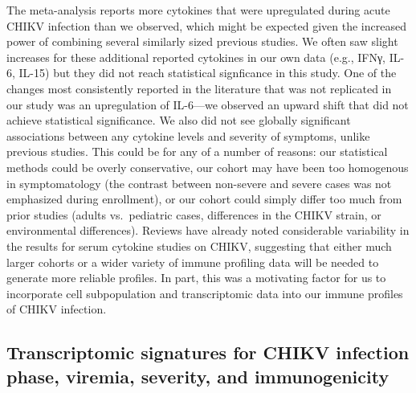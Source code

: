 The meta-analysis reports more cytokines that were upregulated during acute CHIKV infection than we observed, which might be expected given the increased power of combining several similarly sized previous studies. We often saw slight increases for these additional reported cytokines in our own data (e.g., IFNγ, IL-6, IL-15) but they did not reach statistical signficance in this study. One of the changes most consistently reported in the literature that was not replicated in our study was an upregulation of IL-6—we observed an upward shift that did not achieve statistical significance.\autocite{Chow2011,Ng2009} We also did not see globally significant associations between any cytokine levels and severity of symptoms, unlike previous studies.\autocite{Chow2011,Ng2009} This could be for any of a number of reasons: our statistical methods could be overly conservative, our cohort may have been too homogenous in symptomatology (the contrast between non-severe and severe cases was not emphasized during enrollment), or our cohort could simply differ too much from prior studies (adults vs.\ pediatric cases, differences in the CHIKV strain, or environmental differences). Reviews have already noted considerable variability in the results for serum cytokine studies on CHIKV,\autocite{Burt2017} suggesting that either much larger cohorts or a wider variety of immune profiling data will be needed to generate more reliable profiles. In part, this was a motivating factor for us to incorporate cell subpopulation and transcriptomic data into our immune profiles of CHIKV infection.

\subsection{Transcriptomic signatures for CHIKV infection phase, viremia, severity, and immunogenicity}

